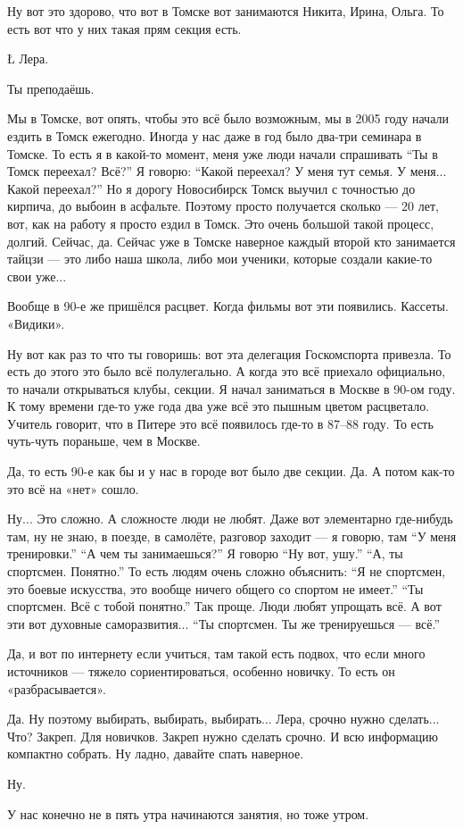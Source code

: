 \I
Ну вот это здорово,
что вот
в Томске вот занимаются
Никита, Ирина, Ольга.
То есть вот
что у них такая прям
секция есть.

\L
Лера.

\N
Ты преподаёшь.

\A
Мы в Томске,
вот опять,
чтобы это всё было возможным,
мы в 2005 году
начали ездить
в Томск
ежегодно.
Иногда у нас даже
в год было
два-три семинара
в Томске.
То есть я
в какой-то момент,
меня уже люди
начали спрашивать
``Ты в Томск переехал?
Всё?''
Я говорю: ``Какой переехал?
У меня тут семья.
У меня...
Какой переехал?''
Но я дорогу
Новосибирск Томск
выучил
с точностью до
кирпича,
до выбоин
в асфальте.
Поэтому
просто
получается
сколько ---
20 лет,
вот,
как на работу
я просто ездил
в Томск.
Это очень большой
такой процесс,
долгий.
Сейчас, да.
Сейчас
уже в Томске
наверное
каждый второй
кто занимается
тайцзи ---
это
либо наша школа,
либо
мои ученики,
которые создали
какие-то свои
уже...

\I
Вообще
в 90-е же
пришёлся
расцвет.
Когда
фильмы
вот эти
появились.
Кассеты.
«Видики».

\A
Ну вот
как раз
то что ты говоришь:
вот эта
делегация
Госкомспорта
привезла.
То есть
до этого
это было
всё полулегально.
А
когда
это всё
приехало
официально,
то начали открываться клубы, секции.
Я начал заниматься в Москве в 90-ом
году.
К тому времени
где-то уже
года два
уже всё это
пышным цветом
расцветало.
Учитель
говорит,
что
в Питере
это всё
появилось
где-то
в 87--88 году.
То есть
чуть-чуть
пораньше,
чем в Москве.

\I
Да,
то есть 90-е
как бы
и у нас
в городе
вот было
две секции.
Да.
А потом
как-то это всё на «нет» сошло.

\A
Ну... Это сложно.
А сложносте люди не любят.
Даже
вот
элементарно
где-нибудь
там,
ну не знаю,
в поезде,
в самолёте,
разговор заходит ---
я говорю, там ``У меня тренировки.''
``А чем ты занимаешься?''
Я говорю ``Ну вот, ушу.''
``А, ты спортсмен. Понятно.''
То есть
людям
очень сложно
объяснить: ``Я не спортсмен,
это боевые искусства,
это вообще ничего общего
со спортом
не имеет.''
``Ты спортсмен. Всё с тобой понятно.''
Так проще. Люди любят упрощать всё.
А вот эти вот
духовные
саморазвития...
``Ты спортсмен.
Ты же тренируешься --- всё.''

\I
Да, и вот
по интернету
если учиться,
там
такой
есть
подвох,
что если
много источников ---
тяжело
сориентироваться,
особенно
новичку.
То есть
он «разбрасывается».

\A
Да.
Ну поэтому
выбирать, выбирать, выбирать...
Лера,
срочно
нужно
сделать...
Что?
Закреп. Для новичков.
Закреп нужно сделать срочно.
И всю
информацию
компактно
собрать.
Ну
ладно,
давайте
спать
наверное.

\I
Ну.

\A
У нас
конечно
не в пять утра
начинаются
занятия,
но
тоже
утром.

\bye

